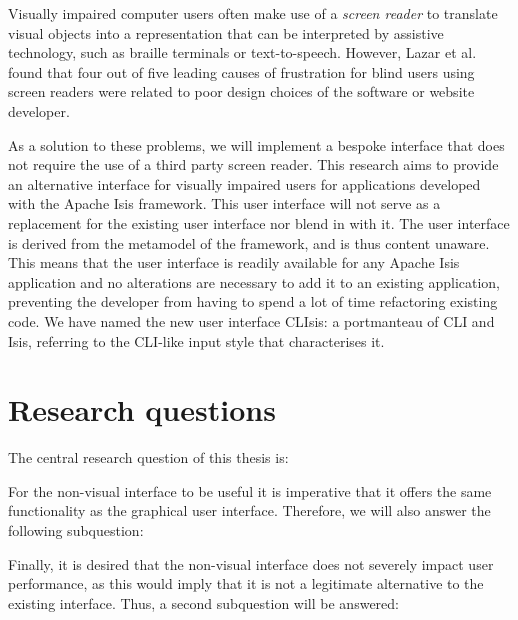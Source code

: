 Visually impaired computer users often make use of a \textit{screen reader} to translate visual objects into a representation that can be interpreted by assistive technology, such as braille terminals or text-to-speech. However, Lazar et al. found that four out of five leading causes of frustration for blind users using screen readers were related to poor design choices of the software or website developer\cite{lazar2007frustrates}. 

As a solution to these problems, we will implement a bespoke interface that does not require the use of a third party screen reader. This research aims to provide an alternative interface for visually impaired users for applications developed with the Apache Isis\cite{Apach60:online} framework. This user interface will not serve as a replacement for the existing user interface nor blend in with it. The user interface is derived from the metamodel of the framework, and is thus content unaware. This means that the user interface is readily available for any Apache Isis application and no alterations are necessary to add it to an existing application, preventing the developer from having to spend a lot of time refactoring existing code. We have named the new user interface CLIsis: a portmanteau of CLI and Isis, referring to the CLI-like input style that characterises it.

\section{Research questions}
\label{section:researchquestions}
The central research question of this thesis is:

 \label{RQ1}

\noindent For the non-visual interface to be useful it is imperative that it offers the same functionality as the graphical user interface. Therefore, we will also answer the following subquestion:

 \label{RQ2}

\noindent Finally, it is desired that the non-visual interface does not severely impact user performance, as this would imply that it is not a legitimate alternative to the existing interface. Thus, a second subquestion will be answered:


